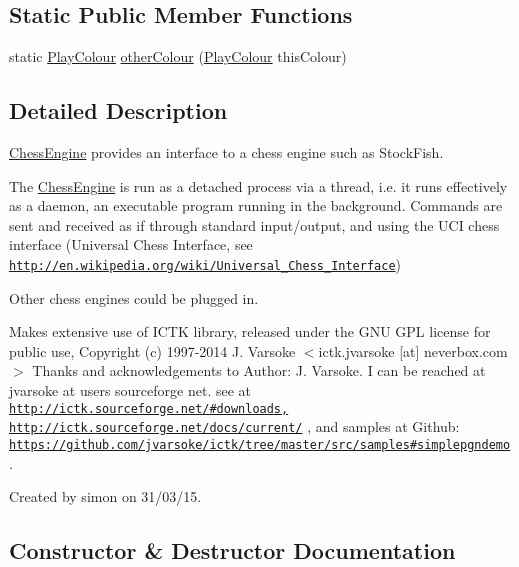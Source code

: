 \subsection*{Static Public Member Functions}
\begin{DoxyCompactItemize}
\item 
static \hyperlink{enumswantech_1_1_play_colour}{Play\+Colour} \hyperlink{classswantech_1_1_chess_engine_a7648685bcb41ac4cf391c39cbccef90a}{other\+Colour} (\hyperlink{enumswantech_1_1_play_colour}{Play\+Colour} this\+Colour)
\end{DoxyCompactItemize}


\subsection{Detailed Description}
\hyperlink{classswantech_1_1_chess_engine}{Chess\+Engine} provides an interface to a chess engine such as Stock\+Fish. 

The \hyperlink{classswantech_1_1_chess_engine}{Chess\+Engine} is run as a detached process via a thread, i.\+e. it runs effectively as a daemon, an executable program running in the background. Commands are sent and received as if through standard input/output, and using the U\+C\+I chess interface (Universal Chess Interface, see \href{http://en.wikipedia.org/wiki/Universal_Chess_Interface}{\tt http\+://en.\+wikipedia.\+org/wiki/\+Universal\+\_\+\+Chess\+\_\+\+Interface}) 

Other chess engines could be plugged in. 

Makes extensive use of I\+C\+T\+K library, released under the G\+N\+U G\+P\+L license for public use, Copyright (c) 1997-\/2014 J. Varsoke $<$ictk.\+jvarsoke \mbox{[}at\mbox{]} neverbox.\+com$>$ Thanks and acknowledgements to Author\+: J. Varsoke. I can be reached at jvarsoke at users sourceforge net. see at \href{http://ictk.sourceforge.net/#downloads,}{\tt http\+://ictk.\+sourceforge.\+net/\#downloads,} \href{http://ictk.sourceforge.net/docs/current/}{\tt http\+://ictk.\+sourceforge.\+net/docs/current/} , and samples at Github\+: \href{https://github.com/jvarsoke/ictk/tree/master/src/samples#simplepgndemo}{\tt https\+://github.\+com/jvarsoke/ictk/tree/master/src/samples\#simplepgndemo}. 

Created by simon on 31/03/15. 

\subsection{Constructor \& Destructor Documentation}
\hypertarget{classswantech_1_1_chess_engine_a206b7f60195b050af7bf73124a359bd5}{}

